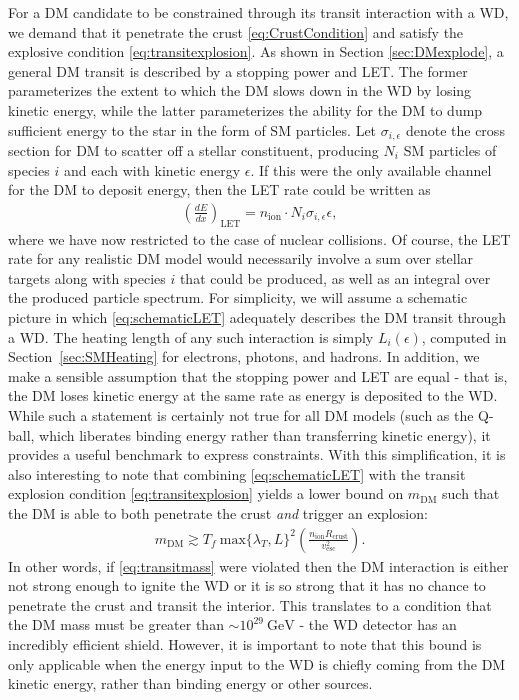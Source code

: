 \documentclass[twocolumn,showpacs,preprintnumbers,amsmath,amssymb,prd]{revtex4}
\newcommand{\GeV}{\text{GeV}}
\def\r{\right)}
\def\l{\left(}
\begin{document}
For a DM candidate to be constrained through its transit interaction with a WD, we demand that it penetrate the crust \eqref{eq:CrustCondition} and satisfy the explosive condition \eqref{eq:transitexplosion}.
As shown in Section \ref{sec:DMexplode}, a general DM transit is described by a stopping power and LET.
The former parameterizes the extent to which the DM slows down in the WD by losing kinetic energy, while the latter parameterizes the ability for the DM to dump sufficient energy to the star in the form of SM particles.
Let $\sigma_{i,\epsilon}$ denote the cross section for DM to scatter off a stellar constituent, producing $N_i$ SM particles of species $i$ and each with kinetic energy $\epsilon$.
If this were the only available channel for the DM to deposit energy, then the LET rate could be written as
\begin{align}
\label{eq:schematicLET}
  \left( \frac{d E}{d x} \right)_\text{LET} = n_\text{ion} \cdot N_i \sigma_{i,\epsilon} \epsilon,
\end{align}
where we have now restricted to the case of nuclear collisions.
Of course, the LET rate for any realistic DM model would necessarily involve a sum over stellar targets along with species $i$ that could be produced, as well as an integral over the produced particle spectrum.
For simplicity, we will assume a schematic picture in which \eqref{eq:schematicLET} adequately describes the DM transit through a WD.
The heating length of any such interaction is simply $L_i(\epsilon)$, computed in Section~\ref{sec:SMHeating} for electrons, photons, and hadrons.
In addition, we make a sensible assumption that the stopping power and LET are equal - that is, the DM loses kinetic energy at the same rate as energy is deposited to the WD.
While such a statement is certainly not true for all DM models (such as the Q-ball, which liberates binding energy rather than transferring kinetic energy), it provides a useful benchmark to express constraints.
With this simplification, it is also interesting to note that combining \eqref{eq:schematicLET} with the transit explosion condition \eqref{eq:transitexplosion} yields a lower bound on $m_{\text{DM}}$ such that the DM is able to both penetrate the crust \emph{and} trigger an explosion:
\begin{align}
\label{eq:transitmass}
m_{\text{DM}} \gtrsim  T_f ~\text{max}\{\lambda_T, L\}^2 \l \frac{n_{\text{ion}} R_{\text{crust}}}{v_{\text{esc}}^2} \r.
\end{align}
In other words, if \eqref{eq:transitmass} were violated then the DM interaction is either not strong enough to ignite the WD or it is so strong that it has no chance to penetrate the crust and transit the interior.
This translates to a condition that the DM mass must be greater than $\sim 10^{29} ~\GeV$ - the WD detector has an incredibly efficient shield.
However, it is important to note that this bound is only applicable when the energy input to the WD is chiefly coming from the DM kinetic energy, rather than binding energy or other sources.
\end{document}
